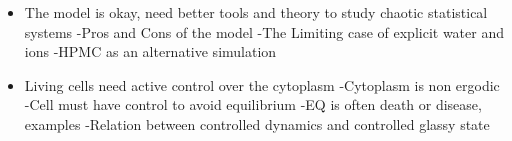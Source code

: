 \documentclass{article}
\begin{document}
\begin{itemize}
\item The model is okay, need better tools and theory to study chaotic statistical systems\newline
-Pros and Cons of the model\newline
-The Limiting case of explicit water and ions\newline
-HPMC as an alternative simulation


\item Living cells need active control over the cytoplasm\newline
-Cytoplasm is non ergodic\newline
-Cell must have control to avoid equilibrium\newline
-EQ is often death or disease, examples\newline
-Relation between controlled dynamics and controlled glassy state
\end{itemize}
\end{document}
